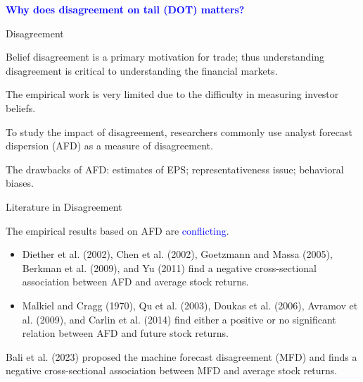 \documentclass[11pt, aspectratio=169]{beamer}
\newenvironment{wideitemize}{\itemize\addtolength{\itemsep}{10pt}}{\enditemize}
\begin{document}
\begin{frame}
    \begin{center}
        {\Large \textbf{\textcolor{blue}{Why does disagreement on tail (DOT) matters?}}}
    \end{center}
\end{frame}

\begin{frame}{Disagreement}
    \begin{wideitemize}
    \item Belief disagreement is a \alert{primary motivation} for trade; thus understanding disagreement is critical to understanding the financial markets.
    \item The empirical work is very limited due to the difficulty in measuring investor beliefs.
    \item To study the impact of disagreement, researchers commonly use \alert{analyst forecast dispersion (AFD)} as a measure of disagreement.
    \item The drawbacks of AFD: estimates of EPS; representativeness issue; behavioral biases.
    \end{wideitemize}
\end{frame}

\begin{frame}{Literature in Disagreement}
    \begin{wideitemize}
    \item The empirical results based on AFD are \textcolor{blue}{conflicting}.
    \bigskip
    \begin{itemize}
        \item Diether et al. (2002), Chen et al. (2002), Goetzmann and Massa (2005), Berkman et al. (2009), and Yu (2011) find a \alert{negative} cross-sectional association between AFD and average stock returns.
    \bigskip
        \item Malkiel and Cragg (1970), Qu et al. (2003), Doukas et al. (2006), Avramov et al. (2009), and Carlin et al. (2014) find either a \alert{positive} or \alert{no significant} relation between AFD and future stock returns.
    \end{itemize}
    \item Bali et al. (2023) proposed the machine forecast disagreement (MFD) and finds a \alert{negative} cross-sectional association between MFD and average stock returns.
    \end{wideitemize}
\end{frame}
\end{document}
